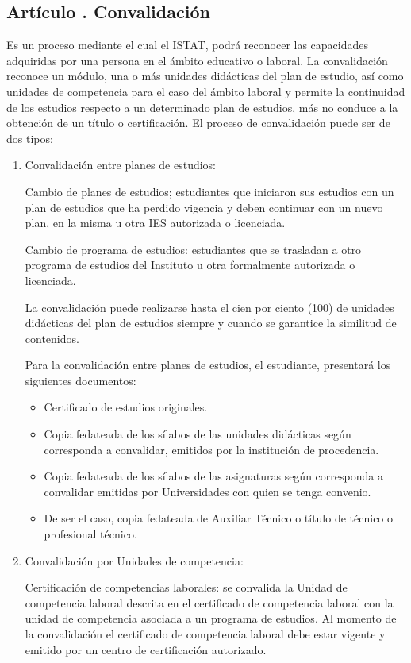 \subsection{Artículo . Convalidación}
\addtocounter{ns}{1}
Es un proceso mediante el cual el ISTAT, podrá reconocer las capacidades adquiridas por una persona en el ámbito educativo o laboral. La convalidación reconoce un módulo, una o más unidades didácticas del plan de estudio, así como unidades de competencia para el caso del ámbito laboral y permite la continuidad de los estudios respecto a un determinado plan de estudios, más no conduce a la obtención de un título o certificación. 
El proceso de convalidación puede ser de dos tipos: 
\begin{enumerate}
\item Convalidación entre planes de estudios:
 
Cambio de planes de estudios; estudiantes que iniciaron sus estudios con un plan de estudios que ha perdido vigencia y deben continuar con un nuevo plan, en la misma u otra IES autorizada o licenciada. 

Cambio de programa de estudios: estudiantes que se trasladan a otro programa de estudios del Instituto u otra formalmente autorizada o licenciada.

La convalidación puede realizarse hasta el cien por ciento (100) de unidades didácticas del plan de estudios siempre y cuando se garantice la similitud de contenidos. 

Para la convalidación entre planes de estudios, el estudiante, presentará los siguientes documentos: 
	\begin{itemize}
		\item Certificado de estudios originales. 
		\item Copia fedateada de los sílabos de las unidades didácticas según corresponda a convalidar, emitidos por la institución de procedencia. 
		\item Copia fedateada de los sílabos de las asignaturas según corresponda a convalidar emitidas por Universidades con quien se tenga convenio. 
		\item De ser el caso, copia fedateada de Auxiliar Técnico o título de técnico o profesional técnico. 
	\end{itemize}
\item Convalidación por Unidades de competencia: 

Certificación de competencias laborales: se convalida la Unidad de competencia laboral descrita en el certificado de competencia laboral con la unidad de competencia asociada a un programa de estudios. Al momento de la convalidación el certificado de competencia laboral debe estar vigente y emitido por un centro de certificación autorizado. 


\end{enumerate}
